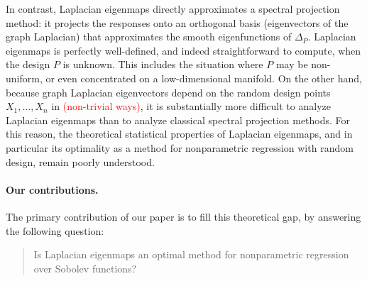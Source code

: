 \documentclass{article}
\newcommand{\1}{\mathbf{1}}
\theoremstyle{alden}
\theoremstyle{aldenthm}
\theoremstyle{definition}
\theoremstyle{remark}
\begin{document}
In contrast, Laplacian eigenmaps directly approximates a spectral projection method: it projects the responses onto an orthogonal basis (eigenvectors of the graph Laplacian) that approximates the smooth eigenfunctions of $\Delta_P$.  Laplacian eigenmaps is perfectly well-defined, and indeed straightforward to compute, when the design $P$ is unknown. This includes the situation where $P$ may be non-uniform, or even concentrated on a low-dimensional manifold. On the other hand, because graph Laplacian eigenvectors depend on the random design points $X_1,\ldots,X_n$ in \textcolor{red}{(non-trivial ways)}, it is substantially more difficult to analyze Laplacian eigenmaps than to analyze classical spectral projection methods. For this reason, the theoretical statistical properties of Laplacian eigenmaps, and in particular its optimality as a method for nonparametric regression with random design, remain poorly understood.

\paragraph{Our contributions.} The primary contribution of our paper is to fill this theoretical gap, by answering the following question:

\begin{quote}
	Is Laplacian eigenmaps an optimal method for nonparametric regression over Sobolev functions?
\end{quote}
\end{document}
